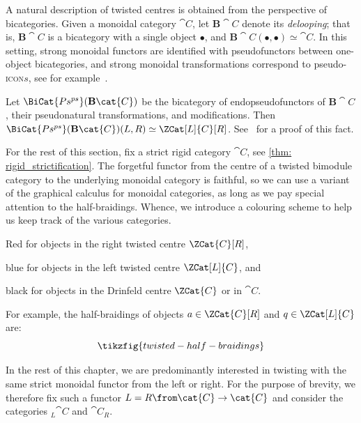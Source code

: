 \begin{remark}\label{rmk:twisted-centre-as-loop}
  A natural description of twisted centres is obtained from the perspective of bicategories.
  Given a monoidal category \(\cat{C}\),
  let \(\mathbf{B}\cat{C}\) denote its \emph{delooping};
  that is, \(\mathbf{B}\cat{C}\) is a bicategory with a single object \(\bullet\),
  and \(\mathbf{B}\cat{C}(\bullet, \bullet) \simeq \cat{C}\).
  In this setting, strong monoidal functors are identified with pseudofunctors between one-object bicategories,
  and strong monoidal transformations correspond to pseudo-\textsc{icon}\(s\),
  see for example~\cite[Proposition~4.6.9]{johnson-yau2021:TwoDimensionalCategories}.

  Let \(\BiCat{Ps^{ps}}(\mathbf{B}\cat{C})\) be the bicategory of endopseudofunctors of \(\mathbf{B}\cat{C}\),
  their pseudonatural transformations,
  and modifications.
  Then \(\BiCat{Ps^{ps}}(\mathbf{B}\cat{C})(L, R) \simeq \ZCat[L]{C}[R]\).
  See~\cite[Proposition~3.6]{femić23:categ-yetter} for a proof of this fact.
\end{remark}

For the rest of this section, fix a strict rigid category \(\cat{C}\), see \cref{thm: rigid_strictification}.
The forgetful functor from the centre of a twisted bimodule category to the underlying monoidal category is faithful,
so we can use a variant of the graphical calculus for monoidal categories, as long as we pay special attention to the half-braidings.
Whence, we introduce a colouring scheme to help us keep track of the various categories.

\begin{thmlist}[noitemsep]
  \item Red for objects in the right twisted centre \(\ZCat{C}[R]\),
  \item blue for objects in the left twisted centre \(\ZCat[L]{C}\), and
  \item black for objects in the Drinfeld centre \(\ZCat{C}\) or in \(\cat{C}\).
\end{thmlist}
For example, the half-braidings of objects \(a \in \ZCat{C}[R]\) and \(q \in \ZCat[L]{C}\) are:
\[
  \tikzfig{twisted-half-braidings}
\]

\begin{hypothesis}\label{conv: twisting_with_only_one_functor}
  In the rest of this chapter, we are predominantly interested in twisting with the same strict monoidal functor from the left or right.
  For the purpose of brevity, we therefore fix such a functor
  \(L = R \from \cat{C} \to \cat{C}\) and consider the categories \({}_{L\!}{\cat{C}}\) and \({\cat{C}}_{R}\).
\end{hypothesis}

